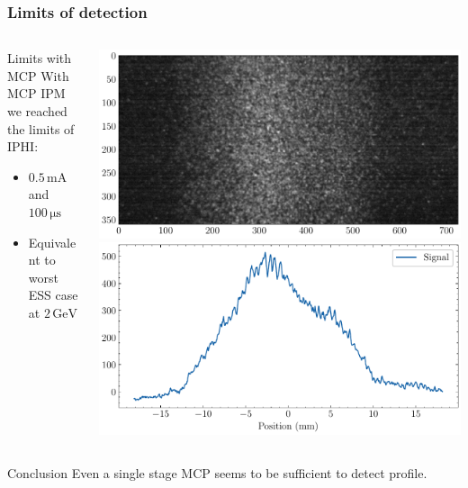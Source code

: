 \begin{frame}
  \frametitle{Limits of detection}
  \begin{columns}[T]
    \begin{column}{0.45\textwidth}
      \begin{block}{Limits with MCP}
        With MCP IPM we reached the limits of IPHI:
        \begin{itemize}
          \item $0.5\,\mathrm{mA}$ and $100\,\mathrm{\mu s}$
          \item Equivalent to worst ESS case at $2\,\mathrm{GeV}$
        \end{itemize}
      \end{block}
    \end{column}
    \begin{column}{0.45\textwidth}
      \includegraphics[width=1\textwidth]{04_Test/fig/fig000_limits_IPHI_a}
      \includegraphics[width=1\textwidth]{04_Test/fig/fig000_limits_IPHI_b}
    \end{column}
  \end{columns}
  \begin{alertblock}{Conclusion}
    Even a single stage MCP seems to be sufficient to detect profile.
  \end{alertblock}
\end{frame}